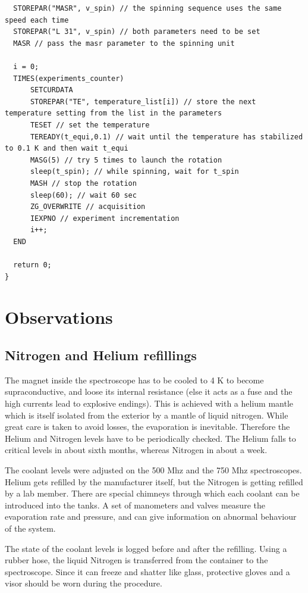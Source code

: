 \documentclass[12pt]{article}
\begin{document}
\begin{verbatim}
  STOREPAR("MASR", v_spin) // the spinning sequence uses the same speed each time
  STOREPAR("L 31", v_spin) // both parameters need to be set
  MASR // pass the masr parameter to the spinning unit

  i = 0;
  TIMES(experiments_counter)
      SETCURDATA 
      STOREPAR("TE", temperature_list[i]) // store the next temperature setting from the list in the parameters
      TESET // set the temperature
      TEREADY(t_equi,0.1) // wait until the temperature has stabilized to 0.1 K and then wait t_equi
      MASG(5) // try 5 times to launch the rotation
      sleep(t_spin); // while spinning, wait for t_spin
      MASH // stop the rotation
      sleep(60); // wait 60 sec 
      ZG_OVERWRITE // acquisition
      IEXPNO // experiment incrementation
      i++; 
  END

  return 0;
}
\end{verbatim}
\section{Observations}

\subsection{Nitrogen and Helium refillings}

The magnet inside the spectroscope has to be cooled to 4 K to become supraconductive, and loose its internal resistance (else it acts as a fuse and the high currents lead to explosive endings). This is achieved with a helium mantle which is itself isolated from the exterior by a mantle of liquid nitrogen. While great care is taken to avoid losses, the evaporation is inevitable. Therefore the Helium and Nitrogen levels have to be periodically checked. The Helium falls to critical levels in about sixth months, whereas Nitrogen in about a week. 

The coolant levels were adjusted on the 500 Mhz and the 750 Mhz spectroscopes. Helium gets refilled by the manufacturer itself, but the Nitrogen is getting refilled by a lab member. There are special chimneys through which each coolant can be introduced into the tanks. A set of manometers and valves measure the evaporation rate and pressure, and can give information on abnormal behaviour of the system.

The state of the coolant levels is logged before and after the refilling. Using a rubber hose, the liquid Nitrogen is transferred from the container to the spectroscope. Since it can freeze and shatter like glass, protective gloves and a visor should be worn during the procedure. 
\end{document}
